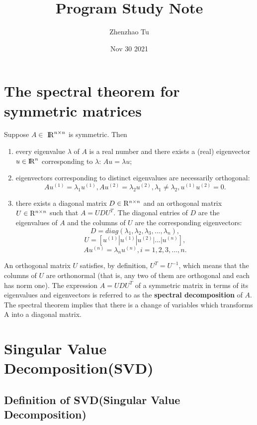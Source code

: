 \documentclass{article}
\title{Program Study Note}
\author{Zhenzhao Tu}
\date{Nov 30 2021}
\newcommand{\an}[1]{{\leavevmode\color{blue}{#1}}}
\begin{document}
\maketitle


\section{The spectral theorem for symmetric matrices}
Suppose $A \in$ 
${\rm I\!R}^{n \times n}$ is symmetric. Then
\\
\begin{enumerate}
	\item every eigenvalue $\lambda$ of $A$ is a real number and there exists a (real) eigenvector ${u \in \rm I\!R}^{n}$ corresponding to $\lambda$:  $Au=\lambda u$;
	\item eigenvectors corresponding to distinct eigenvalues are necessarily orthogonal: 
	\[Au^{(1)} = \lambda_1 u^{(1)} , Au^{(2)} = \lambda_2 u^{(2)}, \lambda_1 \neq \lambda_2, u^{(1)}u^{(2)} = 0.\]
	\item there exists a diagonal matrix  $D\in{\bf {\rm R}}^{n\times n}$ and an orthogonal matrix  $U\in{\bf {\rm R}}^{n\times n}$ such that $A=UDU^T$. The diagonal 
		entries of $D$ are the eigenvalues of $A$ and the columns of $U$ are the corresponding eigenvectors: 
	\[D = diag(\lambda_1, \lambda_2, \lambda_3, ..., \lambda_n),\]
	\[U = [u^{(1)} | u^{(1)} | u^{(2)} | ... | u^{(n)}],\]
	\[Au^{(n)} = \lambda_n u^{(n)}, i = 1,2,3,...,n.\]
\end{enumerate}
An orthogonal matrix $U$ satisfies, by definition, $U^T=U^{-1}$, which means that the columns of $U$ are orthonormal (that is, any two of them are orthogonal and each has norm one). The expression $A=UDU^T$ of a symmetric matrix in terms of its eigenvalues and eigenvectors is referred to as the \textbf{spectral decomposition} of $A$. 
\\
The spectral theorem implies that there is a change of variables which transforms A into a diagonal matrix.

\an{Don't go into the proof yet. First state the SVD. Second, discuss some of its consequences at a high level. Third, prove it.}
\section{Singular Value Decomposition(SVD)}

\subsection{Definition of SVD(Singular Value Decomposition)}
\end{document}

